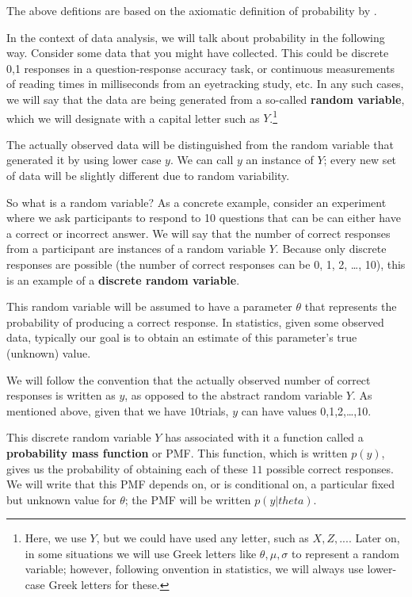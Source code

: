 \documentclass[12pt,]{krantz}
\begin{document}
The above defitions are based on the axiomatic definition of probability by \citet{kolmogorov2018foundations}.

In the context of data analysis, we will talk about probability in the following way. Consider some data that you might have collected. This could be discrete 0,1 responses in a question-response accuracy task, or continuous measurements of reading times in milliseconds from an eyetracking study, etc. In any such cases, we will say that the data are being generated from a so-called \textbf{random variable}, which we will designate with a capital letter such as \(Y\).\footnote{Here, we use \(Y\), but we could have used any letter, such as \(X, Z,...\). Later on, in some situations we will use Greek letters like \(\theta, \mu, \sigma\) to represent a random variable; however, following onvention in statistics, we will always use lower-case Greek letters for these.}

The actually observed data will be distinguished from the random variable that generated it by using lower case \(y\). We can call \(y\) an instance of \(Y\); every new set of data will be slightly different due to random variability.

So what is a random variable? As a concrete example, consider an experiment where we ask participants to respond to 10 questions that can be can either have a correct or incorrect answer. We will say that the number of correct responses from a participant are instances of a random variable \(Y\). Because only discrete responses are possible (the number of correct responses can be 0, 1, 2, \ldots{}, 10), this is an example of a \textbf{discrete random variable}.

This random variable will be assumed to have a parameter \(\theta\) that represents the probability of producing a correct response. In statistics, given some observed data, typically our goal is to obtain an estimate of this parameter's true (unknown) value.

We will follow the convention that the actually observed number of correct responses is written as \(y\), as opposed to the abstract random variable \(Y\). As mentioned above, given that we have \(10\)trials, \(y\) can have values 0,1,2,\ldots{},10.

This discrete random variable \(Y\) has associated with it a function called a \textbf{probability mass function} or PMF. This function, which is written \(p(y)\), gives us the probability of obtaining each of these \(11\) possible correct responses. We will write that this PMF depends on, or is conditional on, a particular fixed but unknown value for \(\theta\); the PMF will be written \(p(y|theta)\).
\end{document}
